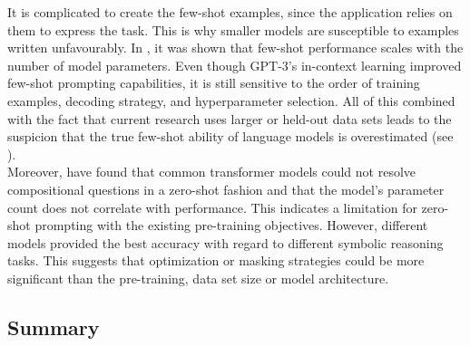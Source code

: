 \documentclass[
]{krantz}
\begin{document}
It is complicated to create the few-shot examples, since the application
relies on them to express the task. This is why smaller models are
susceptible to examples written unfavourably. In \citep{brown2020language}, it was
shown that few-shot performance scales with the number of model
parameters. Even though GPT-3's in-context learning improved few-shot
prompting capabilities, it is still sensitive to the order of training
examples, decoding strategy, and hyperparameter selection. All of this
combined with the fact that current research uses larger or held-out
data sets leads to the suspicion that the true few-shot ability of
language models is overestimated (see \citep{perez2021true}).\\
Moreover, \citep{Lialin2022} have found that common transformer models could
not resolve compositional questions in a zero-shot fashion and that the
model's parameter count does not correlate with performance. This
indicates a limitation for zero-shot prompting with the existing
pre-training objectives. However, different models provided the best
accuracy with regard to different symbolic reasoning tasks. This
suggests that optimization or masking strategies could be more
significant than the pre-training, data set size or model architecture.

\hypertarget{summary}{%
\subsection{Summary}\label{summary}}
\end{document}
